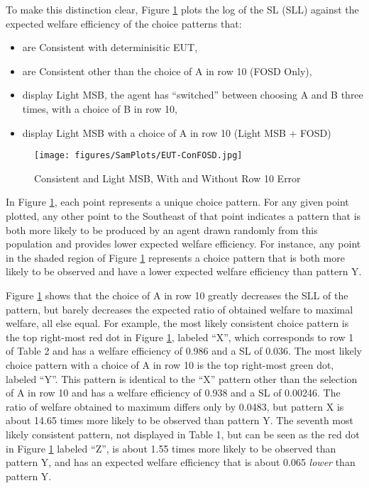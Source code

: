 \documentclass[../main.tex]{subfiles}
\begin{document}
To make this distinction clear, Figure \ref{fig:ConFOSD} plots the log of the SL (SLL) against the expected welfare efficiency of the choice patterns that:
\begin{itemize}
 \setlength\itemsep{-.5em}
	\item are Consistent with determinisitic EUT,
	\item are Consistent other than the choice of A in row 10 (FOSD Only),
	\item display Light MSB, the agent has \enquote{switched} between choosing A and B three times, with a choice of B in row 10,
	\item display Light MSB with a choice of A in row 10 (Light MSB + FOSD)
\end{itemize}

\begin{figure}[h!]
	\caption{Consistent and Light MSB, With and Without Row 10 Error}
	\texttt{[image: figures/SamPlots/EUT-ConFOSD.jpg]}
	\label{fig:ConFOSD}
\end{figure}

In Figure \ref{fig:ConFOSD}, each point represents a unique choice pattern.
For any given point plotted, any other point to the Southeast of that point indicates a pattern that is both more likely to be produced by an agent drawn randomly from this population and provides lower expected welfare efficiency.
For instance, any point in the shaded region of Figure \ref{fig:ConFOSD} represents a choice pattern that is both more likely to be observed and have a lower expected welfare efficiency than pattern Y.

Figure \ref{fig:ConFOSD} shows that the choice of A in row 10 greatly decreases the SLL of the pattern, but barely decreases the expected ratio of obtained welfare to maximal welfare, all else equal.
For example, the most likely consistent choice pattern is the top right-most red dot in Figure \ref{fig:ConFOSD}, labeled \enquote{X}, which corresponds to row 1 of Table 2 and has a welfare efficiency of 0.986 and a SL of 0.036.
The most likely choice pattern with a choice of A in row 10 is the top right-most green dot, labeled \enquote{Y}.
This pattern is identical to the \enquote{X} pattern other than the selection of A in row 10 and has a welfare efficiency of 0.938 and a SL of 0.00246.
The ratio of welfare obtained to maximum differs only by 0.0483, but pattern X is about 14.65 times more likely to be observed than pattern Y.
The seventh most likely consistent pattern, not displayed in Table 1, but can be seen as the red dot in Figure \ref{fig:ConFOSD} labeled \enquote{Z}, is about 1.55 times more likely to be observed than pattern Y, and has an expected welfare efficiency that is about 0.065 \textit{lower} than pattern Y.
\end{document}
